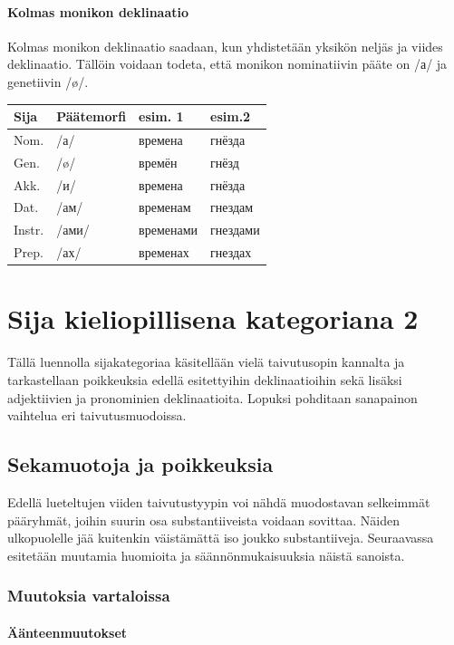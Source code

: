 \documentclass[]{scrreprt}
\begin{document}
\subsubsection{Kolmas monikon deklinaatio}\label{kolmas-monikon-deklinaatio}

Kolmas monikon deklinaatio saadaan, kun yhdistetään yksikön neljäs ja
viides deklinaatio. Tällöin voidaan todeta, että monikon nominatiivin
pääte on /а/ ja genetiivin /ø/.

\begin{longtable}[c]{@{}llll@{}}
\toprule
Sija & Päätemorfi & esim. 1 & esim.2\tabularnewline
\midrule
\endhead
Nom. & /а/ & времена & гнёзда\tabularnewline
Gen. & /ø/ & времён & гнёзд\tabularnewline
Akk. & /и/ & времена & гнёзда\tabularnewline
Dat. & /ам/ & временам & гнездам\tabularnewline
Instr. & /ами/ & временами & гнездами\tabularnewline
Prep. & /ах/ & временах & гнездах\tabularnewline
\bottomrule
\end{longtable}

\chapter{Sija kieliopillisena kategoriana
2}\label{luento-5-sija-kieliopillisena-kategoriana-2}


Tällä luennolla sijakategoriaa käsitellään vielä taivutusopin kannalta
ja tarkastellaan poikkeuksia edellä esitettyihin deklinaatioihin sekä
lisäksi adjektiivien ja pronominien deklinaatioita. Lopuksi pohditaan
sanapainon vaihtelua eri taivutusmuodoissa.

\section{Sekamuotoja ja
poikkeuksia}\label{sekamuotoja-ja-poikkeuksia}

Edellä lueteltujen viiden taivutustyypin voi nähdä muodostavan
selkeimmät pääryhmät, joihin suurin osa substantiiveista voidaan
sovittaa. Näiden ulkopuolelle jää kuitenkin väistämättä iso joukko
substantiiveja. Seuraavassa esitetään muutamia huomioita ja
säännönmukaisuuksia näistä sanoista.

\subsection{Muutoksia vartaloissa}\label{muutoksia-vartaloissa}

\subsubsection{Äänteenmuutokset}\label{uxe4uxe4nteenmuutokset}
\end{document}
